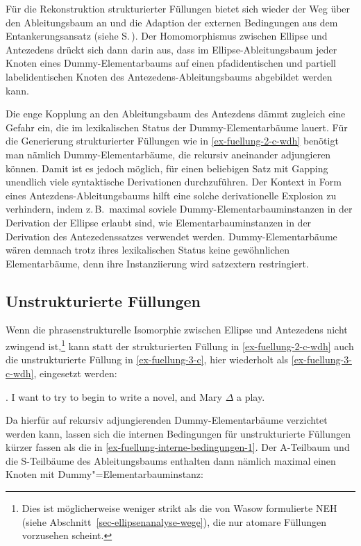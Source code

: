Für die Rekonstruktion strukturierter Füllungen bietet sich wieder der Weg über den Ableitungsbaum an und die Adaption der externen Bedingungen aus dem Entankerungsansatz (siehe S.\,\pageref{sec-deanchoring-extern}). Der Homomorphismus zwischen Ellipse und Antezedens drückt sich dann darin aus, dass im Ellipse-Ableitungsbaum jeder Knoten eines Dummy-Elementarbaums auf einen pfadidentischen und partiell labelidentischen Knoten des Antezedens-Ableitungsbaums abgebildet werden kann.    

Die enge Kopplung an den Ableitungsbaum des Antezdens dämmt zugleich eine Gefahr ein, die im lexikalischen Status der Dummy-Elementarbäume lauert. Für die Generierung strukturierter Füllungen wie in \ref{ex-fuellung-2-c-wdh} benötigt man nämlich Dummy-Elementarbäume, die rekursiv aneinander adjungieren können. Damit ist es jedoch möglich, für einen beliebigen Satz mit Gapping unendlich viele syntaktische Derivationen durchzuführen. Der Kontext in Form eines Antezdens-Ableitungsbaums hilft eine solche derivationelle Explosion zu verhindern, indem z.\,B.\ maximal soviele Dummy-Elementarbauminstanzen in der Derivation der Ellipse erlaubt sind, wie Elementarbauminstanzen in der Derivation des Antezedenssatzes verwendet werden. Dummy-Elementarbäume wären demnach trotz ihres lexikalischen Status keine gewöhnlichen Elementarbäume, denn ihre Instanziierung wird satzextern restringiert.


\subsection{Unstrukturierte Füllungen}

Wenn die phrasenstrukturelle Isomorphie zwischen Ellipse und Antezedens nicht zwingend ist,\footnote{Dies ist möglicherweise weniger strikt als die von Wasow formulierte NEH (siehe Abschnitt~\ref{sec-ellipsenanalyse-wege}), die nur atomare Füllungen vorzusehen scheint.} kann statt der strukturierten Füllung in \ref{ex-fuellung-2-c-wdh} auch die unstrukturierte Füllung in \ref{ex-fuellung-3-c}, hier wiederholt als \ref{ex-fuellung-3-c-wdh}, eingesetzt werden:
  
\ex. I want to try to begin to write a novel, and Mary $\Delta$ a play.\label{ex-fuellung-3-c-wdh}
  
Da hierfür auf rekursiv adjungierenden Dummy-Elementarbäume verzichtet werden kann, lassen sich die internen Bedingungen für unstrukturierte Füllungen kürzer fassen als die in \ref{ex-fuellung-interne-bedingungen-1}. Der A-Teilbaum und die S-Teilbäume des Ableitungsbaums enthalten dann nämlich maximal einen Knoten mit Dummy"=Elementarbauminstanz:

